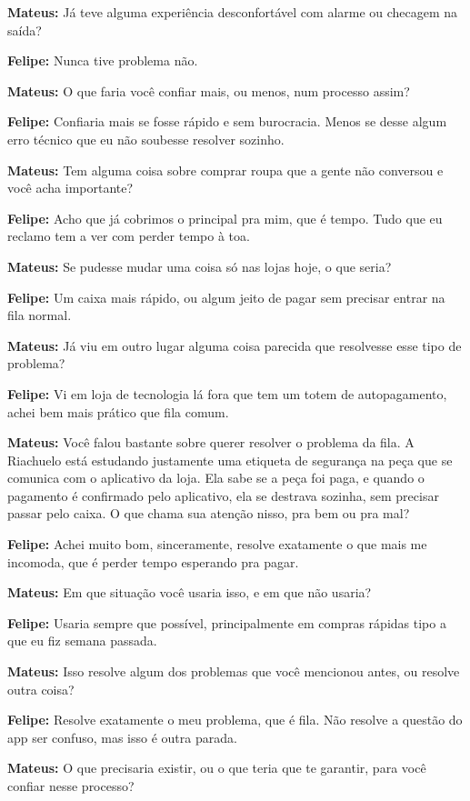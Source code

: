 \textbf{Mateus:} Já teve alguma experiência desconfortável com alarme ou checagem na saída?

\textbf{Felipe:} Nunca tive problema não.

\textbf{Mateus:} O que faria você confiar mais, ou menos, num processo assim?

\textbf{Felipe:} Confiaria mais se fosse rápido e sem burocracia. Menos se desse algum erro técnico que eu não soubesse resolver sozinho.

\textbf{Mateus:} Tem alguma coisa sobre comprar roupa que a gente não conversou e você acha importante?

\textbf{Felipe:} Acho que já cobrimos o principal pra mim, que é tempo. Tudo que eu reclamo tem a ver com perder tempo à toa.

\textbf{Mateus:} Se pudesse mudar uma coisa só nas lojas hoje, o que seria?

\textbf{Felipe:} Um caixa mais rápido, ou algum jeito de pagar sem precisar entrar na fila normal.

\textbf{Mateus:} Já viu em outro lugar alguma coisa parecida que resolvesse esse tipo de problema?

\textbf{Felipe:} Vi em loja de tecnologia lá fora que tem um totem de autopagamento, achei bem mais prático que fila comum.

\textbf{Mateus:} Você falou bastante sobre querer resolver o problema da fila. A Riachuelo está estudando justamente uma etiqueta de segurança na peça que se comunica com o aplicativo da loja. Ela sabe se a peça foi paga, e quando o pagamento é confirmado pelo aplicativo, ela se destrava sozinha, sem precisar passar pelo caixa. O que chama sua atenção nisso, pra bem ou pra mal?

\textbf{Felipe:} Achei muito bom, sinceramente, resolve exatamente o que mais me incomoda, que é perder tempo esperando pra pagar.

\textbf{Mateus:} Em que situação você usaria isso, e em que não usaria?

\textbf{Felipe:} Usaria sempre que possível, principalmente em compras rápidas tipo a que eu fiz semana passada.

\textbf{Mateus:} Isso resolve algum dos problemas que você mencionou antes, ou resolve outra coisa?

\textbf{Felipe:} Resolve exatamente o meu problema, que é fila. Não resolve a questão do app ser confuso, mas isso é outra parada.

\textbf{Mateus:} O que precisaria existir, ou o que teria que te garantir, para você confiar nesse processo?

